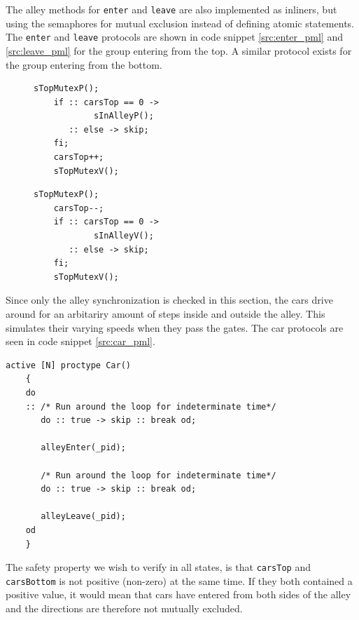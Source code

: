 The alley methods for \texttt{enter} and \texttt{leave} are also implemented as inliners, but using the semaphores for mutual exclusion instead of defining atomic statements. The \texttt{enter} and \texttt{leave} protocols are shown in code snippet \ref{src:enter_pml} and  \ref{src:leave_pml} for the group entering from the top. A similar protocol exists for the group entering from the bottom.
\begin{figure}[H]
    \begin{multicols}{2}
    \begin{lstlisting}[language=promela, caption=\texttt{enter} protocol, label=src:enter_pml]
    sTopMutexP();
    if :: carsTop == 0 ->
        	sInAlleyP();
       :: else -> skip;
    fi;
    carsTop++;
    sTopMutexV();
    \end{lstlisting} 
    
    \begin{lstlisting}[language=promela, caption=\texttt{leave} protocol, label=src:leave_pml]
    sTopMutexP();
    carsTop--;
    if :: carsTop == 0 ->
        	sInAlleyV();
       :: else -> skip;
    fi;
    sTopMutexV();
    \end{lstlisting}
    \end{multicols}
\end{figure}

Since only the alley synchronization is checked in this section, the cars drive around for an arbitariry amount of steps inside and outside the alley. This simulates their varying speeds when they pass the gates. The car protocols are seen in code snippet \ref{src:car_pml}.
    
    \begin{lstlisting}[language=promela, caption=Cars implemented in Promela, label=src:car_pml]
    active [N] proctype Car()
    {
    do 
    :: /* Run around the loop for indeterminate time*/
       do :: true -> skip :: break od; 
    
       alleyEnter(_pid);
    
       /* Run around the loop for indeterminate time*/
       do :: true -> skip :: break od; 
    
       alleyLeave(_pid);
    od
    }
    \end{lstlisting} 

The safety property we wish to verify in all states, is that \texttt{carsTop} and \texttt{carsBottom} is not positive (non-zero) at the same time. If they both contained a positive value, it would mean that cars have entered from both sides of the alley and the directions are therefore not mutually excluded.

